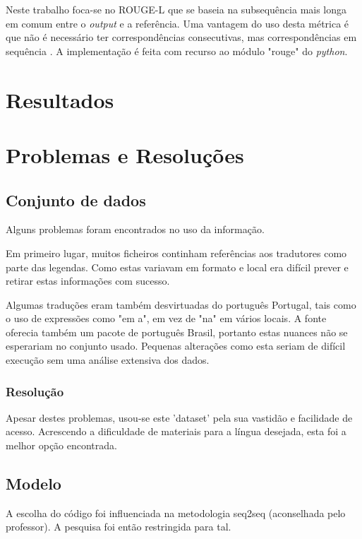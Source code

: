 \documentclass{article}
\begin{document}
Neste trabalho foca-se no ROUGE-L que se baseia na subsequência mais longa em comum entre o \textit{output} e a referência. Uma vantagem do uso desta métrica é que não é necessário ter correspondências consecutivas, mas correspondências em sequência \cite{rouge}. A implementação é feita com recurso ao módulo "rouge" do \textit{python}.

\section{Resultados}



\section{Problemas e Resoluções}

\subsection{Conjunto de dados}
Alguns problemas foram encontrados no uso da informação.

Em primeiro lugar, muitos ficheiros continham referências aos tradutores como parte das legendas. Como estas variavam em formato e local era difícil prever e retirar estas informações com sucesso.

Algumas traduções eram também desvirtuadas do português Portugal, tais como o uso de expressões como "em a", em vez de "na" em vários locais. A fonte oferecia também um pacote de português Brasil, portanto estas nuances não se esperariam no conjunto usado. Pequenas alterações como esta seriam de difícil execução sem uma análise extensiva dos dados.

\subsubsection{Resolução}


Apesar destes problemas, usou-se este 'dataset' pela sua vastidão e facilidade de acesso. Acrescendo a dificuldade de materiais para a língua desejada, esta foi a melhor opção encontrada.

\subsection{Modelo}
A escolha do código foi influenciada na metodologia seq2seq (aconselhada pelo professor). A pesquisa foi então restringida para tal.
\end{document}
